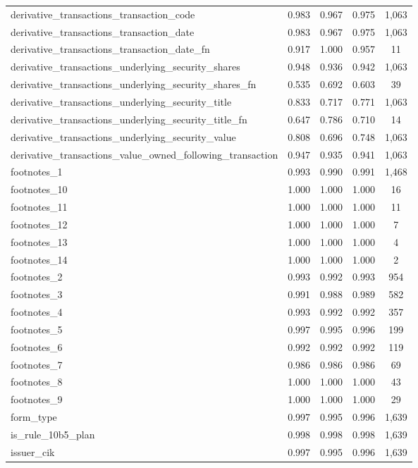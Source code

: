 \documentclass[journal, onecolumn]{IEEEtran}
\begin{document}
\begin{small}
\begin{longtable}{lcccc}
derivative\_transactions\_transaction\_code & 0.983 & 0.967 & 0.975 & 1,063 \\
derivative\_transactions\_transaction\_date & 0.983 & 0.967 & 0.975 & 1,063 \\
derivative\_transactions\_transaction\_date\_fn & 0.917 & 1.000 & 0.957 & 11 \\
derivative\_transactions\_underlying\_security\_shares & 0.948 & 0.936 & 0.942 & 1,063 \\
derivative\_transactions\_underlying\_security\_shares\_fn & 0.535 & 0.692 & 0.603 & 39 \\
derivative\_transactions\_underlying\_security\_title & 0.833 & 0.717 & 0.771 & 1,063 \\
derivative\_transactions\_underlying\_security\_title\_fn & 0.647 & 0.786 & 0.710 & 14 \\
derivative\_transactions\_underlying\_security\_value & 0.808 & 0.696 & 0.748 & 1,063 \\
derivative\_transactions\_value\_owned\_following\_transaction & 0.947 & 0.935 & 0.941 & 1,063 \\
footnotes\_1 & 0.993 & 0.990 & 0.991 & 1,468 \\
footnotes\_10 & 1.000 & 1.000 & 1.000 & 16 \\
footnotes\_11 & 1.000 & 1.000 & 1.000 & 11 \\
footnotes\_12 & 1.000 & 1.000 & 1.000 & 7 \\
footnotes\_13 & 1.000 & 1.000 & 1.000 & 4 \\
footnotes\_14 & 1.000 & 1.000 & 1.000 & 2 \\
footnotes\_2 & 0.993 & 0.992 & 0.993 & 954 \\
footnotes\_3 & 0.991 & 0.988 & 0.989 & 582 \\
footnotes\_4 & 0.993 & 0.992 & 0.992 & 357 \\
footnotes\_5 & 0.997 & 0.995 & 0.996 & 199 \\
footnotes\_6 & 0.992 & 0.992 & 0.992 & 119 \\
footnotes\_7 & 0.986 & 0.986 & 0.986 & 69 \\
footnotes\_8 & 1.000 & 1.000 & 1.000 & 43 \\
footnotes\_9 & 1.000 & 1.000 & 1.000 & 29 \\
form\_type & 0.997 & 0.995 & 0.996 & 1,639 \\
is\_rule\_10b5\_plan & 0.998 & 0.998 & 0.998 & 1,639 \\
issuer\_cik & 0.997 & 0.995 & 0.996 & 1,639 \\

\end{longtable}
\end{small}
\end{document}
